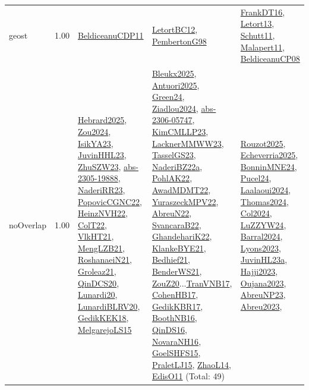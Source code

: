 {\begin{longtable}{p{3cm}r>{\raggedright\arraybackslash}p{6cm}>{\raggedright\arraybackslash}p{6cm}>{\raggedright\arraybackslash}p{8cm}}
\index{geost}\index{Constraints!geost}geost &  1.00 & \hyperref[detail:BeldiceanuCDP11]{BeldiceanuCDP11} & \hyperref[detail:LetortBC12]{LetortBC12}, \hyperref[detail:PembertonG98]{PembertonG98} & \hyperref[detail:FrankDT16]{FrankDT16}, \hyperref[detail:Letort13]{Letort13}, \hyperref[detail:Schutt11]{Schutt11}, \hyperref[detail:Malapert11]{Malapert11}, \hyperref[detail:BeldiceanuCP08]{BeldiceanuCP08}\\
\index{noOverlap}\index{Constraints!noOverlap}noOverlap &  1.00 & \hyperref[detail:Hebrard2025]{Hebrard2025}, \hyperref[detail:Zou2024]{Zou2024}, \hyperref[detail:IsikYA23]{IsikYA23}, \hyperref[detail:JuvinHHL23]{JuvinHHL23}, \hyperref[detail:ZhuSZW23]{ZhuSZW23}, \hyperref[detail:abs-2305-19888]{abs-2305-19888}, \hyperref[detail:NaderiRR23]{NaderiRR23}, \hyperref[detail:PopovicCGNC22]{PopovicCGNC22}, \hyperref[detail:HeinzNVH22]{HeinzNVH22}, \hyperref[detail:ColT22]{ColT22}, \hyperref[detail:VlkHT21]{VlkHT21}, \hyperref[detail:MengLZB21]{MengLZB21}, \hyperref[detail:RoshanaeiN21]{RoshanaeiN21}, \hyperref[detail:Groleaz21]{Groleaz21}, \hyperref[detail:QinDCS20]{QinDCS20}, \hyperref[detail:Lunardi20]{Lunardi20}, \hyperref[detail:LunardiBLRV20]{LunardiBLRV20}, \hyperref[detail:GedikKEK18]{GedikKEK18}, \hyperref[detail:MelgarejoLS15]{MelgarejoLS15} & \hyperref[detail:Bleukx2025]{Bleukx2025}, \hyperref[detail:Antuori2025]{Antuori2025}, \hyperref[detail:Green24]{Green24}, \hyperref[detail:Ziadlou2024]{Ziadlou2024}, \hyperref[detail:abs-2306-05747]{abs-2306-05747}, \hyperref[detail:KimCMLLP23]{KimCMLLP23}, \hyperref[detail:LacknerMMWW23]{LacknerMMWW23}, \hyperref[detail:TasselGS23]{TasselGS23}, \hyperref[detail:NaderiBZ22a]{NaderiBZ22a}, \hyperref[detail:PohlAK22]{PohlAK22}, \hyperref[detail:AwadMDMT22]{AwadMDMT22}, \hyperref[detail:YuraszeckMPV22]{YuraszeckMPV22}, \hyperref[detail:AbreuN22]{AbreuN22}, \hyperref[detail:SvancaraB22]{SvancaraB22}, \hyperref[detail:GhandehariK22]{GhandehariK22}, \hyperref[detail:KlankeBYE21]{KlankeBYE21}, \hyperref[detail:Bedhief21]{Bedhief21}, \hyperref[detail:BenderWS21]{BenderWS21}, \hyperref[detail:ZouZ20]{ZouZ20}...\hyperref[detail:TranVNB17]{TranVNB17}, \hyperref[detail:CohenHB17]{CohenHB17}, \hyperref[detail:GedikKBR17]{GedikKBR17}, \hyperref[detail:BoothNB16]{BoothNB16}, \hyperref[detail:QinDS16]{QinDS16}, \hyperref[detail:NovaraNH16]{NovaraNH16}, \hyperref[detail:GoelSHFS15]{GoelSHFS15}, \hyperref[detail:PraletLJ15]{PraletLJ15}, \hyperref[detail:ZhaoL14]{ZhaoL14}, \hyperref[detail:EdisO11]{EdisO11} (Total: 49) & \hyperref[detail:Rouzot2025]{Rouzot2025}, \hyperref[detail:Echeverria2025]{Echeverria2025}, \hyperref[detail:BonninMNE24]{BonninMNE24}, \hyperref[detail:Pucel24]{Pucel24}, \hyperref[detail:Laalaoui2024]{Laalaoui2024}, \hyperref[detail:Thomas2024]{Thomas2024}, \hyperref[detail:Col2024]{Col2024}, \hyperref[detail:LuZZYW24]{LuZZYW24}, \hyperref[detail:Barral2024]{Barral2024}, \hyperref[detail:Lyons2023]{Lyons2023}, \hyperref[detail:JuvinHL23a]{JuvinHL23a}, \hyperref[detail:Hajji2023]{Hajji2023}, \hyperref[detail:Oujana2023]{Oujana2023}, \hyperref[detail:AbreuNP23]{AbreuNP23}, \hyperref[detail:Abreu2023]{Abreu2023}, 
\end{longtable}}
